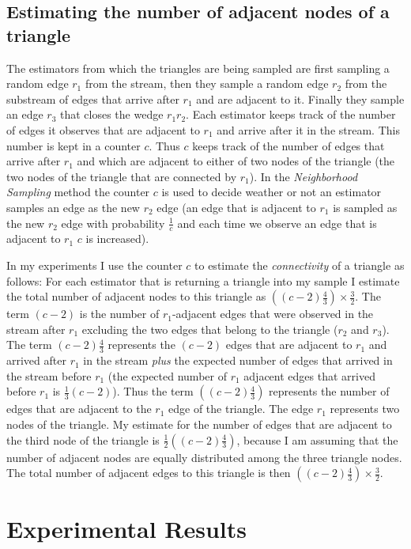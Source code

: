 \documentclass[12pt,twoside,a4paper]{report}
\begin{document}
\subsection{Estimating the number of adjacent nodes of a triangle}
The estimators from which the triangles are being sampled are first sampling a random edge $r_1$ from the stream, then they sample a random edge $r_2$ from the substream of edges that arrive after $r_1$ and are adjacent to it. Finally they sample an edge $r_3$ that closes the wedge $r_1r_2$. Each estimator keeps track of the number of edges it observes that are adjacent to $r_1$ and arrive after it in the stream. This number is kept in a counter $c$. Thus $c$ keeps track of the number of edges that arrive after $r_1$ and which are adjacent to either of two nodes of the triangle (the two nodes of the triangle that are connected by $r_1$). In the \textit{Neighborhood Sampling} method the counter $c$ is used to decide weather or not an estimator samples an edge as the new $r_2$ edge (an edge that is adjacent to $r_1$ is sampled as the new $r_2$ edge with probability $\frac{1}{c}$ and each time we observe an edge that is adjacent to $r_1$ $c$ is increased).

In my experiments I use the counter $c$ to estimate the \textit{connectivity} of a triangle as follows: For each estimator that is returning a triangle into my sample I estimate the total number of adjacent nodes to this triangle as $((c-2)\frac{4}{3})\times\frac{3}{2}$. The term $(c-2)$ is the number of $r_1$-adjacent edges that were observed in the stream after $r_1$ excluding the two edges that belong to the triangle ($r_2$ and $r_3$). The term $(c-2)\frac{4}{3}$ represents the $(c-2)$ edges that are adjacent to $r_1$ and arrived after $r_1$ in the stream \textit{plus} the expected number of edges that arrived in the stream before $r_1$ (the expected number of $r_1$ adjacent edges that arrived before $r_1$ is $\frac{1}{3}(c-2)$). Thus the term $((c-2)\frac{4}{3})$ represents the number of edges that are adjacent to the $r_1$ edge of the triangle. The edge $r_1$ represents two nodes of the triangle. My estimate for the number of edges that are adjacent to the third node of the triangle is $\frac{1}{2}((c-2)\frac{4}{3})$, because I am assuming that the number of adjacent nodes are equally distributed among the three triangle nodes. The total number of adjacent edges to this triangle is then $((c-2)\frac{4}{3})\times\frac{3}{2}$.
\section{Experimental Results}
\end{document}

